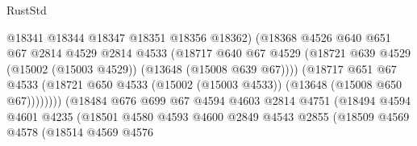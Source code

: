 \begin{lexlean}{RustStd}
\begin{coremodule}
                                      @18341
                                      @18344
                                      @18347
                                      @18351
                                      @18356
                                      @18362)
                                    (@18368
                                      @4526
                                      @640
                                      @651
                                      @67
                                      @2814
                                      @4529
                                      @2814
                                      @4533
                                      (@18717
                                        @640
                                        @67
                                        @4529
                                        (@18721
                                          @639
                                          @4529
                                          (@15002 (@15003 @4529))
                                          (@13648 (@15008 @639 @67))))
                                      (@18717
                                        @651
                                        @67
                                        @4533
                                        (@18721
                                          @650
                                          @4533
                                          (@15002 (@15003 @4533))
                                          (@13648 (@15008 @650 @67))))))))
                              (@18484
                                @676
                                @699
                                @67
                                @4594
                                @4603
                                @2814
                                @4751
                                (@18494
                                  @4594
                                  @4601
                                  @4235
                                  (@18501
                                    @4580
                                    @4593
                                    @4600
                                    @2849
                                    @4543
                                    @2855
                                    (@18509
                                      @4569
                                      @4578
                                      (@18514
                                        @4569
                                        @4576

\end{coremodule}
\end{lexlean}
